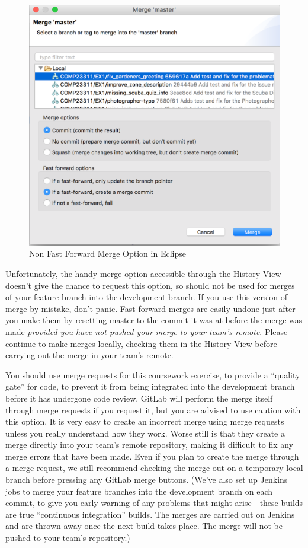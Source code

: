 \documentclass[
]{book}
\begin{document}
\begin{figure}

{\centering \includegraphics[width=0.8\linewidth]{images/NonFFMergeOption} 

}

\caption{Non Fast Forward Merge Option in Eclipse}\label{fig:NonFFMergeOption-fig}
\end{figure}

Unfortunately, the handy merge option accessible through the History View doesn't give the chance to request this option, so should not be used for merges of your feature branch into the development branch. If you use this version of merge by mistake, don't panic. Fast forward merges are easily undone just after you make them by resetting master to the commit it was at before the merge was made \emph{provided you have not pushed your merge to your team's remote}. Please continue to make merges locally, checking them in the History View before carrying out the merge in your team's remote.

You should use merge requests for this coursework exercise, to provide a ``quality gate'' for code, to prevent it from being integrated into the development branch before it has undergone code review. GitLab will perform the merge itself through merge requests if you request it, but you are advised to use caution with this option. It is very easy to create an incorrect merge using merge requests unless you really understand how they work. Worse still is that they create a merge directly into your team's remote repository, making it difficult to fix any merge errors that have been made. Even if you plan to create the merge through a merge request, we still recommend checking the merge out on a temporary local branch before pressing any GitLab merge buttons. (We've also set up Jenkins jobs to merge your feature branches into the development branch on each commit, to give you early warning of any problems that might arise---these builds are true ``continuous integration'' builds. The merges are carried out on Jenkins and are thrown away once the next build takes place. The merge will not be pushed to your team's repository.)
\end{document}
